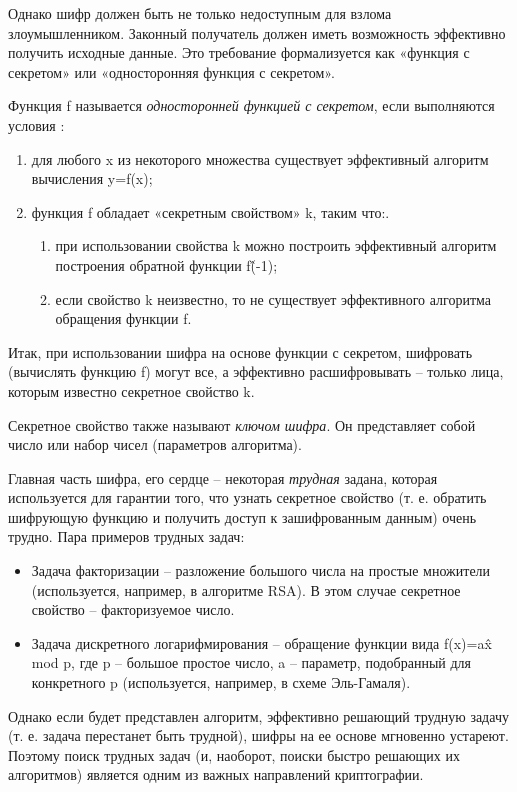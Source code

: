 Однако шифр должен быть не только недоступным для взлома злоумышленником. Законный получатель должен иметь возможность эффективно получить исходные данные. Это требование формализуется как «функция с секретом» или «односторонняя функция с секретом».

Функция f называется \textit{односторонней функцией с секретом}, если выполняются условия \cite{src12}:
\begin{enumerate}
	\item для любого x из некоторого множества существует эффективный алгоритм вычисления y=f(x);
	\item функция f обладает «секретным свойством» k, таким что:.
	\begin{enumerate}
		\item при использовании свойства k можно построить эффективный алгоритм построения обратной функции f\^(-1);
		\item если свойство k неизвестно, то не существует эффективного алгоритма обращения функции f.
	\end{enumerate}
\end{enumerate}

Итак, при использовании шифра на основе функции с секретом, шифровать (вычислять функцию f) могут все, а эффективно расшифровывать – только лица, которым известно секретное свойство k.

Секретное свойство также называют \textit{ключом шифра}. Он представляет собой число или набор чисел (параметров алгоритма).

Главная часть шифра, его сердце – некоторая \textit{трудная} задана, которая используется для гарантии того, что узнать секретное свойство (т. е. обратить шифрующую функцию и получить доступ к зашифрованным данным) очень трудно. Пара примеров трудных задач:
\begin{itemize}
	\item Задача факторизации – разложение большого числа на простые множители (используется, например, в алгоритме RSA). В этом случае секретное свойство – факторизуемое число.
	\item Задача дискретного логарифмирования – обращение функции вида f(x)=a\^x  mod p, где p – большое простое число, a – параметр, подобранный для конкретного p (используется, например, в схеме Эль-Гамаля).
\end{itemize}

Однако если будет представлен алгоритм, эффективно решающий трудную задачу (т. е. задача перестанет быть трудной), шифры на ее основе мгновенно устареют. Поэтому поиск трудных задач (и, наоборот, поиски быстро решающих их алгоритмов) является одним из важных направлений криптографии.

